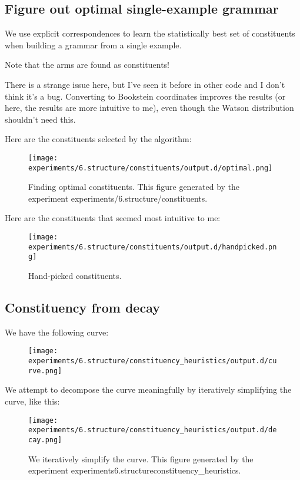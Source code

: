 
\subsection{Figure out optimal single-example grammar}

We use explicit correspondences to learn the statistically best set of
constituents when building a grammar from a single example.

Note that the arms are found as constituents!

There is a strange issue here, but I've seen it before in other code
and I don't think it's a bug. Converting to Bookstein coordinates
improves the results (or here, the results are more intuitive to me),
even though the Watson distribution shouldn't need this.

Here are the constituents selected by the algorithm:

\begin{figure}
\texttt{[image: experiments/6.structure/constituents/output.d/optimal.png]}
\caption[Finding optimal constituents]{Finding optimal constituents. This figure generated by the experiment experiments/6.structure/constituents.}
\end{figure}

Here are the constituents that seemed most intuitive to me:

\begin{figure}
\texttt{[image: experiments/6.structure/constituents/output.d/handpicked.png]}
\caption[Hand-picked constituents]{Hand-picked constituents.}
\end{figure}

\subsection{Constituency from decay}

We have the following curve:

\begin{figure}
\texttt{[image: experiments/6.structure/constituency\_heuristics/output.d/curve.png]}
\end{figure}

We attempt to decompose the curve meaningfully by iteratively
simplifying the curve, like this:

\begin{figure}
\texttt{[image: experiments/6.structure/constituency\_heuristics/output.d/decay.png]}
\caption[Constituency heuristics]{We iteratively simplify the curve. This figure generated by the experiment experiments\/6.structure\/constituency\_heuristics.}
\end{figure}

